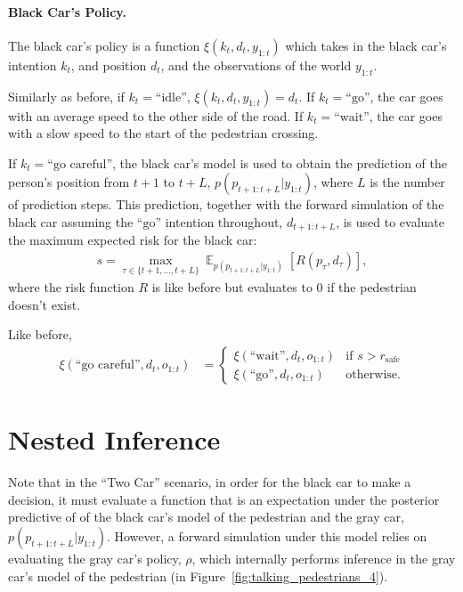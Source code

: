 \documentclass[a4paper]{article}
\newcommand{\given}{\lvert}
\DeclareMathOperator{\E}{\mathbb{E}}
\begin{document}
\paragraph{Black Car's Policy.}
The black car's policy is a function $\xi(k_t, d_t, y_{1:t})$ which takes in the black car's intention $k_t$, and position $d_t$, and the observations of the world $y_{1:t}$.

Similarly as before, if $k_t = \text{``idle''}$, $\xi(k_t, d_t, y_{1:t}) = d_t$.
If $k_t = \text{``go''}$, the car goes with an average speed to the other side of the road.
If $k_t = \text{``wait''}$, the car goes with a slow speed to the start of the pedestrian crossing.

If $k_t = \text{``go careful''}$, the black car's model is used to obtain the prediction of the person's position from $t + 1$ to $t + L$, $p(p_{t + 1:t + L} \given y_{1:t})$,  where $L$ is the number of prediction steps.
This prediction, together with the forward simulation of the black car assuming the $\text{``go''}$ intention throughout, $d_{t + 1:t + L}$, is used to evaluate the maximum expected risk for the black car:
\begin{align}
    s = \max_{\tau \in \{t + 1, \dotsc, t + L\}} \E_{p(p_{t + 1:t + L} \given y_{1:t})}[R(p_\tau, d_\tau)],
\end{align}
where the risk function $R$ is like before but evaluates to $0$ if the pedestrian doesn't exist.

Like before, 
\begin{align}
    \xi(\text{``go careful''}, d_t, o_{1:t}) &=
    \begin{cases}
        \xi(\text{``wait''}, d_t, o_{1:t}) & \text{if } s > r_{\text{safe}} \\
        \xi(\text{``go''}, d_t, o_{1:t}) & \text{otherwise}.
    \end{cases}
\end{align}

\section{Nested Inference}
Note that in the ``Two Car'' scenario, in order for the black car to make a decision, it must evaluate a function that is an expectation under the posterior predictive of of the black car's model of the pedestrian and the gray car, $p(p_{t + 1:t + L} \given y_{1:t})$.
However, a forward simulation under this model relies on evaluating the gray car's policy, $\rho$, which internally performs inference in the gray car's model of the pedestrian (in Figure~\ref{fig:talking_pedestrians_4}).
\end{document}
